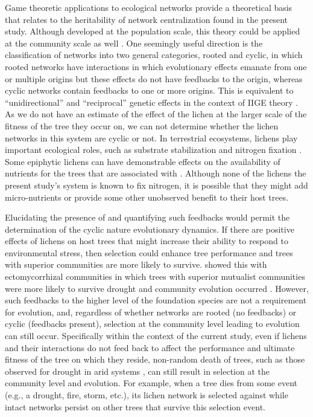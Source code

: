 \documentclass[fleqn,12pt]{olplainarticle}
\begin{document}
Game theoretic applications to ecological networks provide a
theoretical basis that relates to the heritability of network
centralization found in the present study. Although developed at the
population scale, this theory could be applied at the community scale
as well \citep{Lieberman2005EvolutionaryGraphs}. One seemingly useful
direction is the classification of networks into two general
categories, rooted and cyclic, in which rooted networks have
interactions in which evolutionary effects emanate from one or
multiple origins but these effects do not have feedbacks to the
origin, whereas cyclic networks contain feedbacks to one or more
origins. This is equivalent to ``unidirectional'' and ``reciprocal''
genetic effects in the context of IIGE theory
\citep{Whitham2020IntraspecificEvolution}. As we do not have an
estimate of the effect of the lichen at the larger scale of the
fitness of the tree they occur on, we can not determine whether the
lichen networks in this system are cyclic or not. In terrestrial
ecosystems, lichens play important ecological roles, such as substrate
stabilization \citep{Root2011BioticWashington} and nitrogen fixation
\citep{Nelson2018LichenHelens}. Some epiphytic lichens can have
demonstrable effects on the availability of nutrients for the trees
that are associated with \citep{Norby1989NitrogenDioxide}.  Although
none of the lichens the present study's system is known to fix
nitrogen, it is possible that they might add micro-nutrients or
provide some other unobserved benefit to their host trees.

Elucidating the presence of and quantifying such feedbacks would
permit the determination of the cyclic nature evolutionary
dynamics. If there are positive effects of lichens on host trees that
might increase their ability to respond to environmental stress, then
selection could enhance tree performance and trees with superior
communities are more likely to survive.  \cite{Gehring2014PlantChange,
  Gehring2017afix} showed this with ectomycorrhizal communities in which
trees with superior mutualist communities were more likely to survive
drought and community evolution occurred
\citep{Whitham2020IntraspecificEvolution}.  However, such feedbacks to
the higher level of the foundation species are not a requirement for
evolution, and, regardless of whether networks are rooted (no
feedbacks) or cyclic (feedbacks present), selection at the community
level leading to evolution can still occur.  Specifically within the
context of the current study, even if lichens and their interactions
do not feed back to affect the performance and ultimate fitness of the
tree on which they reside, non-random death of trees, such as those
observed for drought in arid systems \cite{Sthultz2009, Gehring2017afix},
can still result in selection at the community level and
evolution. For example, when a tree dies from some event (e.g., a
drought, fire, storm, etc.), its lichen network is selected against
while intact networks persist on other trees that survive this
selection event.
\end{document}
